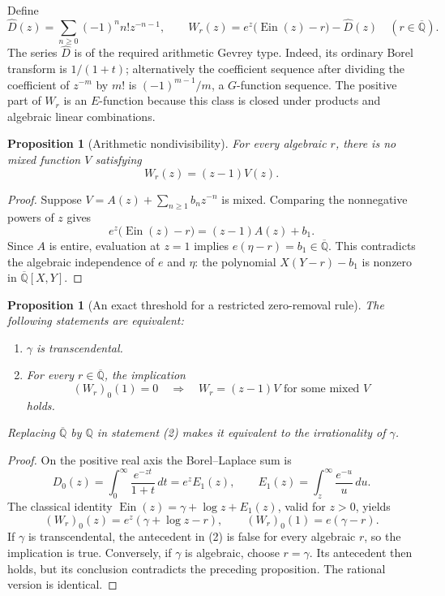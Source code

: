 \documentclass[11pt,a4paper]{article}
\newtheorem{proposition}[theorem]{Proposition}
\theoremstyle{definition}
\theoremstyle{remark}
\numberwithin{equation}{section}
\begin{document}
Define
\[
 \widehat D(z)=\sum_{n\geq0}(-1)^n n!z^{-n-1},\qquad
 W_r(z)=e^z\bigl(\operatorname{Ein}(z)-r\bigr)-\widehat D(z)
 \quad(r\in\overline{\mathbb Q}).
\]
The series $\widehat D$ is of the required arithmetic Gevrey type. Indeed,
its ordinary Borel transform is $1/(1+t)$; alternatively the coefficient
sequence after dividing the coefficient of $z^{-m}$ by $m!$ is
$(-1)^{m-1}/m$, a $G$-function sequence. The positive part of $W_r$ is an
$E$-function because this class is closed under products and algebraic
linear combinations.

\begin{proposition}[Arithmetic nondivisibility]
For every algebraic $r$, there is no mixed function $V$ satisfying
\[
 W_r(z)=(z-1)V(z).
\]
\end{proposition}
\begin{proof}
Suppose $V=A(z)+\sum_{n\geq1}b_nz^{-n}$ is mixed. Comparing the
nonnegative powers of $z$ gives
\[
 e^z\bigl(\operatorname{Ein}(z)-r\bigr)=(z-1)A(z)+b_1.
\]
Since $A$ is entire, evaluation at $z=1$ implies
$e(\eta-r)=b_1\in\overline{\mathbb Q}$. This contradicts the algebraic
independence of $e$ and $\eta$: the polynomial
$X(Y-r)-b_1$ is nonzero in $\overline{\mathbb Q}[X,Y]$.
\end{proof}

\begin{proposition}[An exact threshold for a restricted zero-removal rule]
The following statements are equivalent:
\begin{enumerate}
\item $\gamma$ is transcendental.
\item For every $r\in\overline{\mathbb Q}$, the implication
\[
 (W_r)_0(1)=0\quad\Longrightarrow\quad
 W_r=(z-1)V\text{ for some mixed }V
\]
holds.
\end{enumerate}
Replacing $\overline{\mathbb Q}$ by $\mathbb Q$ in statement (2) makes it
equivalent to the irrationality of $\gamma$.
\end{proposition}
\begin{proof}
On the positive real axis the Borel--Laplace sum is
\[
 D_0(z)=\int_0^\infty\frac{e^{-zt}}{1+t}\,dt
       =e^z E_1(z),\qquad
 E_1(z)=\int_z^\infty\frac{e^{-u}}u\,du.
\]
The classical identity
$\operatorname{Ein}(z)=\gamma+\log z+E_1(z)$, valid for $z>0$, yields
\[
 (W_r)_0(z)=e^z(\gamma+\log z-r),\qquad
 (W_r)_0(1)=e(\gamma-r).
\]
If $\gamma$ is transcendental, the antecedent in (2) is false for every
algebraic $r$, so the implication is true. Conversely, if $\gamma$ is
algebraic, choose $r=\gamma$. Its antecedent then holds, but its conclusion
contradicts the preceding proposition. The rational version is identical.
\end{proof}
\end{document}
